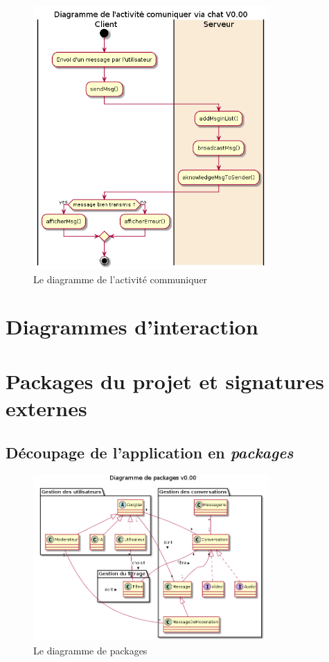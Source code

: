 \documentclass[11pt,dvipsnames,svgnames]{report}
\begin{document}
\begin{figure}[H]
\centerline{\includegraphics[width=0.8\textwidth]{diagrammes/activity-sendMsg-diag.png}}
\caption{Le diagramme de l'activité \og communiquer \fg}
\end{figure}


\section{Diagrammes d’interaction}

\section{Packages du projet et signatures externes}

\subsection{Découpage de l'application en \emph{packages}}
\begin{figure}[H]
\centerline{\includegraphics[width=0.8\textwidth]{diagrammes/package-diag.png}}
\caption{Le diagramme de packages}
\end{figure}
\end{document}
